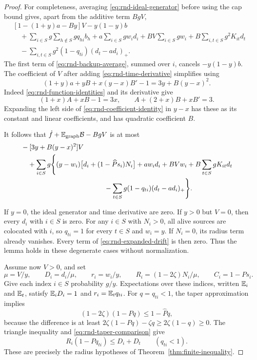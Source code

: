 \begin{proof}
For completeness, averaging \eqref{eq:rnd-ideal-generator} before
using the cap bound gives, apart from the additive term $BgV$,
\begin{align*}
 &[1-(1+y)a-By]V-y(1-y)b\\
 &\quad+\sum_{i\in S}g\sum_{h\notin S}gq_{hi}b_h
       +a\sum_{i\in S}gw_id_i+BV\sum_{i\in S}gw_i
       +B\sum_{i,t\in S}g^2K_{it}d_t\\
 &\quad-\sum_{i,t\in S}g^2(1-q_{ti})(d_t-ad_i)_+.
\end{align*}
The first term of \eqref{eq:rnd-backup-average}, summed over $i$,
cancels $-y(1-y)b$.  The coefficient of $V$ after adding
\eqref{eq:rnd-time-derivative} simplifies using
\begin{equation}\label{eq:rnd-coefficient-identity}
 (1+y)a+yB+x(y-x)B'-1=3y+B(y-x)^2.
\end{equation}
Indeed \eqref{eq:rnd-function-identities} and its derivative give
\[
 (1+x)A+xB-1=3x,
 \qquad A+(2+x)B+xB'=3.
\]
Expanding the left side of \eqref{eq:rnd-coefficient-identity} in
$y-x$ has these as its constant and linear coefficients, and has
quadratic coefficient $B$.

It follows that $\dot f+\mathbb E_{\mathrm{graph}}\mathcal B-BgV$ is at most
\begin{equation}\label{eq:rnd-expanded-drift}
\begin{aligned}
 &-[3y+B(y-x)^2]V\\
 &\quad+\sum_{i\in S}g\Bigg\{
 (y-w_i)\bigl[d_i+(1-\widehat Ps_i)N_i\bigr]+aw_id_i
       +BVw_i+B\sum_{t\in S}gK_{it}d_t\\
 &\hspace{43mm}
       -\sum_{t\in S}g(1-q_{ti})(d_t-ad_i)_+\Bigg\}.
\end{aligned}
\end{equation}

If $y=0$, the ideal generator and time derivative are zero.  If
$y>0$ but $V=0$, then every $d_i$ with $i\in S$ is zero.  For any
$i\in S$ with $N_i>0$, all alive sources are colocated with $i$, so
$q_{ti}=1$ for every $t\in S$ and $w_i=y$.  If $N_i=0$, its radius
term already vanishes.  Every term of
\eqref{eq:rnd-expanded-drift} is then zero.  Thus the lemma holds
in these degenerate cases without normalization.

Assume now $V>0$, and set
\begin{equation}\label{eq:rnd-normalization}
 \mu=V/y,\qquad
 D_i=d_i/\mu,\qquad
 r_i=w_i/y,\qquad
 R_i=(1-2\zeta)N_i/\mu,\qquad C_i=1-Ps_i.
\end{equation}
Give each index $i\in S$ probability $g/y$.  Expectations over these
indices, written $\mathbb E_i$ and $\mathbb E_t$, satisfy
$\mathbb E_iD_i=1$ and $r_i=\mathbb E_tq_{ti}$.
For $q=q_{ti}<1$, the taper approximation implies
\[
 (1-2\zeta)(1-Pq)\le1-\widehat Pq,
\]
because the difference is at least
$2\zeta(1-Pq)-\zeta q\ge2\zeta(1-q)\ge0$.
The triangle inequality and \eqref{eq:rnd-taper-comparison} give
\begin{equation}\label{eq:rnd-normalized-comparison}
 R_i(1-Pq_{ti})\le D_i+D_t\qquad(q_{ti}<1).
\end{equation}
These are precisely the radius hypotheses of
Theorem~\ref{thm:finite-inequality}.


\end{proof}
